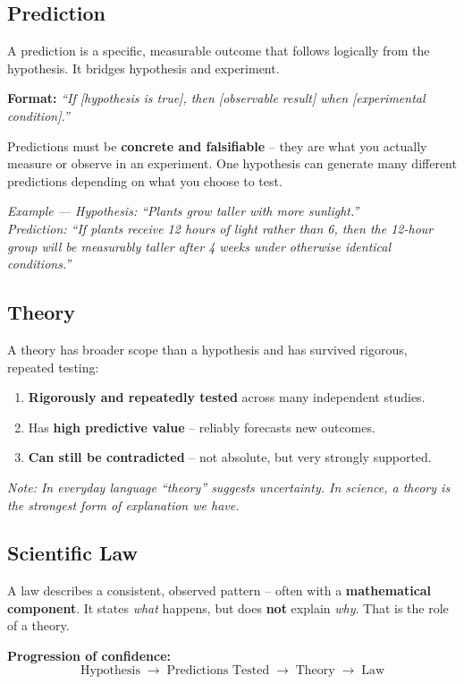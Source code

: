 \documentclass[11pt, letterpaper]{article}
\begin{document}
\subsection*{Prediction}
A prediction is a specific, measurable outcome that follows logically from the hypothesis. It bridges hypothesis and experiment.

\textbf{Format:} \emph{``If [hypothesis is true], then [observable result] when [experimental condition].''}

Predictions must be \textbf{concrete and falsifiable} -- they are what you actually measure or observe in an experiment. One hypothesis can generate many different predictions depending on what you choose to test.

\textit{Example --- Hypothesis: ``Plants grow taller with more sunlight.''\\
Prediction: ``If plants receive 12 hours of light rather than 6, then the 12-hour group will be measurably taller after 4 weeks under otherwise identical conditions.''}

\subsection*{Theory}
A theory has broader scope than a hypothesis and has survived rigorous, repeated testing:
\begin{enumerate}[noitemsep]
  \item \textbf{Rigorously and repeatedly tested} across many independent studies.
  \item Has \textbf{high predictive value} -- reliably forecasts new outcomes.
  \item \textbf{Can still be contradicted} -- not absolute, but very strongly supported.
\end{enumerate}
\textit{Note: In everyday language ``theory'' suggests uncertainty. In science, a theory is the strongest form of explanation we have.}

\subsection*{Scientific Law}
A law describes a consistent, observed pattern -- often with a \textbf{mathematical component}. It states \emph{what} happens, but does \textbf{not} explain \emph{why}. That is the role of a theory.

\vspace{4pt}
\textbf{Progression of confidence:}
\[
  \text{Hypothesis} \;\longrightarrow\; \text{Predictions Tested} \;\longrightarrow\; \text{Theory} \;\longrightarrow\; \text{Law}
\]
\end{document}
